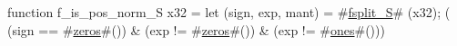 function f_is_pos_norm_S   x32 = {
  let (sign, exp, mant) = #\hyperref[sailRISCVzfsplitzyS]{fsplit\_S}# (x32);
  (  (sign == #\hyperref[sailRISCVzzzeros]{zeros}#())
   & (exp  != #\hyperref[sailRISCVzzzeros]{zeros}#())
   & (exp  != #\hyperref[sailRISCVzones]{ones}#()))
}

